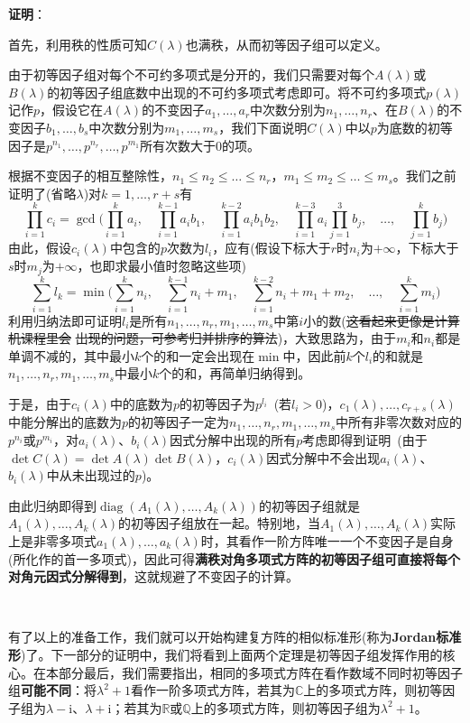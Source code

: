 \documentclass[a4paper,UTF8,fontset=windows,AutoFakeBold]{ctexart}
\DeclareMathOperator{\diag}{diag}
\newcommand*{\ir}{\mathrm{i}}
\newcommand*{\note}{\noindent *}
\newcommand{\proo}[1]{{\vspace{5pt}\kaishu\noindent\textbf{证明}：\vspace{-3pt}
\begin{compactitem}
    \item[] #1
\end{compactitem}
}}
\begin{document}
\proo{
    首先，利用秩的性质可知$C(\lambda)$也满秩，从而初等因子组可以定义。

    由于初等因子组对每个不可约多项式是分开的，我们只需要对每个$A(\lambda)$或$B(\lambda)$的初等因子组底数中出现的不可约多项式考虑即可。将不可约多项式$p(\lambda)$记作$p$，假设它在$A(\lambda)$的不变因子$a_1,\dots,a_r$中次数分别为$n_1,\dots,n_r$、在$B(\lambda)$的不变因子$b_1,\dots,b_s$中次数分别为$m_1,\dots,m_s$，我们下面说明$C(\lambda)$中以$p$为底数的初等因子是$p^{n_1},\dots,p^{n_r},\dots,p^{m_1}$所有次数大于0的项。

    根据不变因子的相互整除性，$n_1\le n_2\le\dots\le n_r$，$m_1\le m_2\le\dots\le m_s$。我们之前证明了(省略$\lambda$)对$k=1,\dots,r+s$有
    $$\prod_{i=1}^kc_i=\gcd\bigg(\prod_{i=1}^ka_i,\quad\prod_{i=1}^{k-1}a_ib_1,\quad\prod_{i=1}^{k-2}a_ib_1b_2,\quad\prod_{i=1}^{k-3}a_i\prod_{j=1}^3b_j,\quad\dots,\quad\prod_{j=1}^kb_j\bigg)$$
    由此，假设$c_i(\lambda)$中包含的$p$次数为$l_i$，应有(假设下标大于$r$时$n_i$为$+\infty$，下标大于$s$时$m_j$为$+\infty$，也即求最小值时忽略这些项)
    $$\sum_{i=1}^kl_k=\min\bigg(\sum_{i=1}^kn_i,\quad\sum_{i=1}^{k-1}n_i+m_1,\quad\sum_{i=1}^{k-2}n_i+m_1+m_2,\quad\dots,\quad\sum_{i=1}^km_i\bigg)$$
    利用归纳法即可证明$l_i$是所有$n_1,\dots,n_r,m_1,\dots,m_s$中第$i$小的数(\sout{这看起来更像是计算机课程里会} \sout{出现的问题，可参考归并排序的算法})，大致思路为，由于$m_i$和$n_i$都是单调不减的，其中最小$k$个的和一定会出现在$\min$中，因此前$k$个$l_i$的和就是$n_1,\dots,n_r,m_1,\dots,m_s$中最小$k$个的和，再简单归纳得到。

    于是，由于$c_i(\lambda)$中的底数为$p$的初等因子为$p^{l_i}$\ (若$l_i>0$)，$c_1(\lambda),\dots,c_{r+s}(\lambda)$中能分解出的底数为$p$的初等因子一定为$n_1,\dots,n_r,m_1,\dots,m_s$中所有非零次数对应的$p^{n_i}$或$p^{m_i}$，对$a_i(\lambda)$、$b_i(\lambda)$因式分解中出现的所有$p$考虑即得到证明\ (由于$\det C(\lambda)=\det A(\lambda)\det B(\lambda)$，$c_i(\lambda)$因式分解中不会出现$a_i(\lambda)$、$b_i(\lambda)$中从未出现过的$p$)。
}

\note 由此归纳即得到$\diag(A_1(\lambda),\dots,A_k(\lambda))$的初等因子组就是$A_1(\lambda),\dots,A_k(\lambda)$的初等因子组放在一起。特别地，当$A_1(\lambda),\dots,A_k(\lambda)$实际上是非零多项式$a_1(\lambda),\dots,a_k(\lambda)$时，其看作一阶方阵唯一一个不变因子是自身(所化作的首一多项式)，因此可得\textbf{满秩对角多项式方阵的初等因子组可直接将每个对角元因式分解得到}，这就规避了不变因子的计算。

\

有了以上的准备工作，我们就可以开始构建复方阵的相似标准形(称为\textbf{Jordan标准形})了。下一部分的证明中，我们将看到上面两个定理是初等因子组发挥作用的核心。在本部分最后，我们需要指出，相同的多项式方阵在看作数域不同时初等因子组\textbf{可能不同}：将$\lambda^2+1$看作一阶多项式方阵，若其为$\mathbb{C}$上的多项式方阵，则初等因子组为$\lambda-\ir$、$\lambda+\ir$；若其为$\mathbb{R}$或$\mathbb{Q}$上的多项式方阵，则初等因子组为$\lambda^2+1$。
\end{document}
